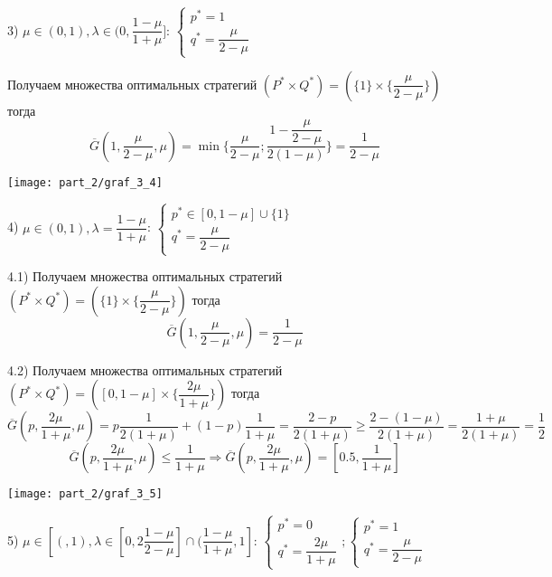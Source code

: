 3) $\mu \in (0,1), \lambda \in (0, \dfrac{1 - \mu}{1 + \mu}]$: 
$
	\begin{cases}
		p^* = 1 \\ 
		q^* = \dfrac{\mu}{2 - \mu} 
	\end{cases}
$

\hfill \break
Получаем множества оптимальных стратегий 
$(P^* \times Q^*) = (\{1\} \times \{\dfrac{\mu}{2 - \mu}\})$ тогда
$$
	\overline G(1, \dfrac{\mu}{2 - \mu}, \mu)=
	\min \big\{
		\dfrac{\mu}{2 - \mu}; 
		\dfrac{1 - \dfrac{\mu}{2 - \mu}}{2(1 - \mu)}
	\big\}
	=\dfrac{1}{2 - \mu}
$$

\begin{center}
\texttt{[image: part\_2/graf\_3\_4]}
\end{center}


4) $\mu \in (0,1), \lambda = \dfrac{1 - \mu}{1 + \mu}$:
$
	\begin{cases}
		p^* \in [0, 1 - \mu] \cup \{1\} \\
		q^* = \dfrac{\mu}{2 - \mu}
	\end{cases}
$

\hfill \break

4.1) Получаем множества оптимальных стратегий 
$(P^* \times Q^*) = (\{1\} \times \{\dfrac{\mu}{2 - \mu}\})$ тогда
$$
	\overline G(1,\dfrac{\mu}{2-\mu},\mu)=\dfrac{1}{2-\mu}
$$

4.2) Получаем множества оптимальных стратегий 
$(P^* \times Q^*) =([0,1-\mu] \times \{\dfrac{2\mu}{1+\mu}\})$ тогда
$$
	\overline G(p,\dfrac{2\mu}{1+\mu},\mu) =
	p\dfrac{1}{2(1 + \mu)} + (1 - p)\dfrac{1}{1 + \mu}=
	\dfrac{2 - p}{2(1 + \mu)} \geqslant
	\dfrac{2 - (1 - \mu)}{2(1 + \mu)} =
	\dfrac{1 + \mu}{2(1 + \mu)} =
	\dfrac{1}{2}
$$
$$
	\overline G(p, \dfrac{2\mu}{1 + \mu}, \mu) \leqslant 
	\dfrac{1}{1 + \mu} \Rightarrow
	\overline G (p, \dfrac{2\mu}{1 + \mu}, \mu) = 
	[0.5, 	\dfrac{1}{1 + \mu}]
$$

\begin{center}
\texttt{[image: part\_2/graf\_3\_5]}
\end{center}


5) $\mu \in [(, 1), \lambda \in 
[0, 2\dfrac{1 - \mu}{2 - \mu}] \cap (\dfrac{1 - \mu}{1 + \mu}, 1]$: 
$
	\begin{cases}
		p^* = 0 \\
		q^* = \dfrac{2\mu}{1 + \mu}
	\end{cases};
	\begin{cases}
		p^* = 1 \\
		q^* = \dfrac{\mu}{2 - \mu}
	\end{cases}
$

